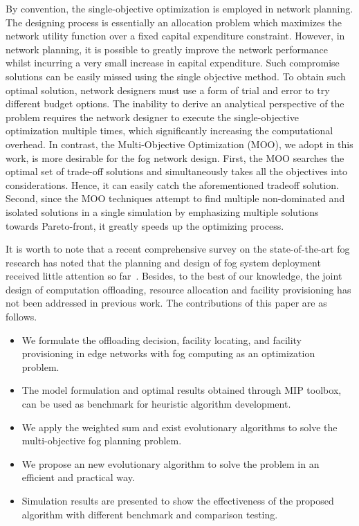 \documentclass[10pt,journal,compsoc]{IEEEtran}
\begin{document}
By convention, the single-objective optimization is employed in network planning. The designing process is essentially an allocation problem which maximizes the network utility function over a fixed capital expenditure constraint. 
However, in network planning, it is possible to greatly improve the network performance whilst incurring a very small increase in capital expenditure. Such compromise solutions can be easily missed using the single objective method. To obtain such optimal solution, network designers must use a form of trial and error to try different budget options. The inability to derive an analytical perspective of the problem requires the network designer to execute the single-objective optimization multiple times, which significantly increasing the computational overhead. 
In contrast, the Multi-Objective Optimization (MOO), we adopt in this work, is more desirable for the fog network design. First, the MOO searches the optimal set of trade-off solutions and simultaneously takes all the objectives into considerations. Hence, it can easily catch the aforementioned tradeoff solution.
Second, since the MOO techniques attempt to find multiple non-dominated and isolated solutions in a single simulation by emphasizing multiple solutions towards Pareto-front, it greatly speeds up the optimizing process. 





It is worth to note that a recent comprehensive survey on the state-of-the-art fog research has noted that the planning and design of fog system deployment received little attention so far~\cite{mouradian2017comprehensive}. Besides, to the best of our knowledge, the joint design of computation offloading, resource allocation and facility provisioning has not been addressed in previous work. The contributions of this paper are as follows.
\begin{itemize}
\item We formulate the offloading decision, facility locating, and facility provisioning in edge networks with fog computing as an optimization problem.
\item The model formulation and optimal results obtained through MIP toolbox, can be used as benchmark for heuristic algorithm development.
\item We apply the weighted sum and exist evolutionary algorithms to solve  the multi-objective fog planning problem.
\item We propose an new evolutionary algorithm to solve the problem in an efficient and practical way.
\item Simulation results are presented to show the effectiveness of the proposed algorithm with different benchmark and comparison testing.
\end{itemize}
\end{document}
